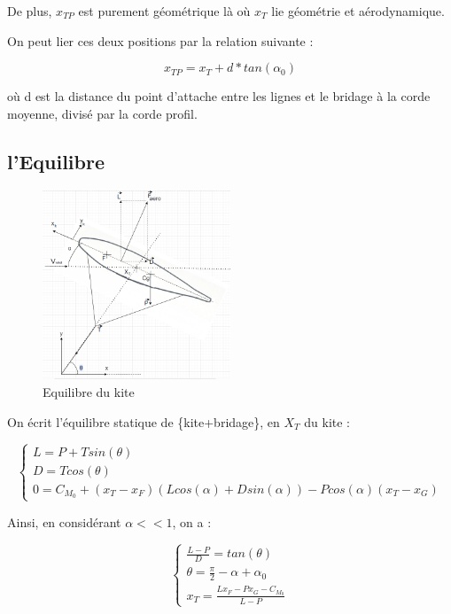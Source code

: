 \documentclass[conference]{IEEEtran}
\begin{document}
De plus, $x_{TP}$ est purement géométrique là où $x_T$ lie géométrie et aérodynamique.

On peut lier ces deux positions par la relation suivante : 

\begin{equation}
    x_{TP} = x_T + d * tan(\alpha_0)
    \label{eq:Xtp}
\end{equation}

où d est la distance du point d’attache entre les lignes et le bridage à la corde moyenne, divisé par la corde profil.

\subsection{l'Equilibre} 

\begin{figure}[H]
    \centering
    \includegraphics[width=0.5\textwidth]{Pics/Equilibre Kite.png}  
    \caption{Equilibre du kite}
    \label{fig:Equilibre du kite}
\end{figure}

On écrit l'équilibre statique de \{kite+bridage\}, en $X_T$ du kite : 

\begin{equation}
    \begin{cases}
        L = P + T sin(\theta) \\
        D = T cos(\theta) \\
        0 = C_{M_0} + (x_T - x_F) (L cos(\alpha) + D sin(\alpha)) - P cos(\alpha) (x_T - x_G)
    \end{cases}
\end{equation}

Ainsi, en considérant $\alpha << 1$, on a :

\begin{equation}
    \begin{cases}
    \frac{L-P}{D} = tan(\theta) \\
    \theta = \frac{\pi}{2} - \alpha + \alpha_0 \\
    x_T = \frac{L x_F - P x_G -C_{M_0}}{L - P}
    \end{cases}
    \label{eq:Xt}
\end{equation}
    
\end{document}
